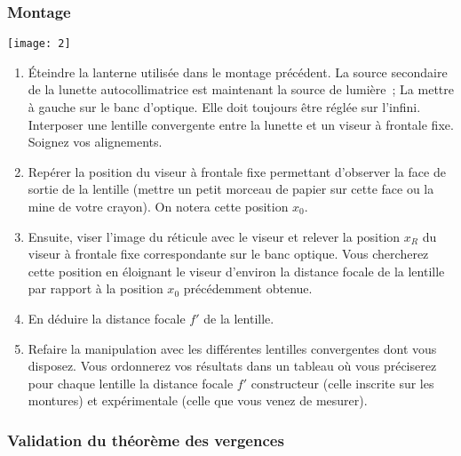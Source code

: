 \documentclass[a4paper, 12pt, final, garamond]{book}
\begin{document}
\subsubsection{Montage}

\begin{center}
    \texttt{[image: 2]}
\end{center}
  
\begin{enumerate}
    \item Éteindre la lanterne utilisée dans le montage précédent. La source
        secondaire de la lunette autocollimatrice est maintenant la source de
        lumière~; La mettre à gauche sur le banc d'optique. Elle doit toujours
        être réglée sur l'infini. Interposer une lentille convergente entre la
        lunette et un viseur à frontale fixe. Soignez vos alignements.

    \item Repérer la position du viseur à frontale fixe permettant d'observer
        la face de sortie de la lentille (mettre un petit morceau de papier sur
        cette face ou la mine de votre crayon). On notera cette position $x_0$.

    \item Ensuite, viser l'image du réticule avec le viseur et relever la
        position $x_{R}$ du viseur à frontale fixe correspondante sur le banc
        optique. Vous chercherez cette position en éloignant le viseur d'environ
        la distance focale de la lentille par rapport à la position $x_0$
        précédemment obtenue. 

    \item En déduire la distance focale $f'$ de la lentille.

    \item Refaire la manipulation avec les différentes lentilles convergentes
        dont vous disposez. Vous ordonnerez vos résultats dans un tableau où
        vous préciserez pour chaque lentille la distance focale $f'$
        constructeur (celle inscrite sur les montures) et expérimentale
        (celle que vous venez de mesurer).   
\end{enumerate}
  
\subsubsection{Validation du théorème des vergences}
  
\end{document}
